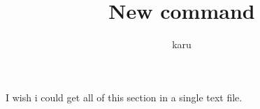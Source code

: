 \documentclass[a4paper]{article}
\title{New command}
\author{karu}
\begin{document}
I wish i could get all of this section in a single text file. 
\end{document}
